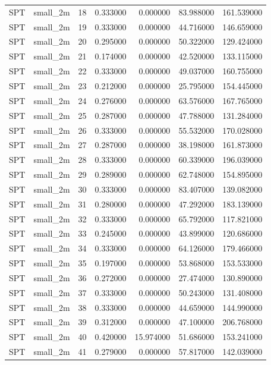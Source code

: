 \begin{tabular}{llrrrrr}
SPT & small_2m & 18 & 0.333000 & 0.000000 & 83.988000 & 161.539000 \\
SPT & small_2m & 19 & 0.333000 & 0.000000 & 44.716000 & 146.659000 \\
SPT & small_2m & 20 & 0.295000 & 0.000000 & 50.322000 & 129.424000 \\
SPT & small_2m & 21 & 0.174000 & 0.000000 & 42.520000 & 133.115000 \\
SPT & small_2m & 22 & 0.333000 & 0.000000 & 49.037000 & 160.755000 \\
SPT & small_2m & 23 & 0.212000 & 0.000000 & 25.795000 & 154.445000 \\
SPT & small_2m & 24 & 0.276000 & 0.000000 & 63.576000 & 167.765000 \\
SPT & small_2m & 25 & 0.287000 & 0.000000 & 47.788000 & 131.284000 \\
SPT & small_2m & 26 & 0.333000 & 0.000000 & 55.532000 & 170.028000 \\
SPT & small_2m & 27 & 0.287000 & 0.000000 & 38.198000 & 161.873000 \\
SPT & small_2m & 28 & 0.333000 & 0.000000 & 60.339000 & 196.039000 \\
SPT & small_2m & 29 & 0.289000 & 0.000000 & 62.748000 & 154.895000 \\
SPT & small_2m & 30 & 0.333000 & 0.000000 & 83.407000 & 139.082000 \\
SPT & small_2m & 31 & 0.280000 & 0.000000 & 47.292000 & 183.139000 \\
SPT & small_2m & 32 & 0.333000 & 0.000000 & 65.792000 & 117.821000 \\
SPT & small_2m & 33 & 0.245000 & 0.000000 & 43.899000 & 120.686000 \\
SPT & small_2m & 34 & 0.333000 & 0.000000 & 64.126000 & 179.466000 \\
SPT & small_2m & 35 & 0.197000 & 0.000000 & 53.868000 & 153.533000 \\
SPT & small_2m & 36 & 0.272000 & 0.000000 & 27.474000 & 130.890000 \\
SPT & small_2m & 37 & 0.333000 & 0.000000 & 50.243000 & 131.408000 \\
SPT & small_2m & 38 & 0.333000 & 0.000000 & 44.659000 & 144.990000 \\
SPT & small_2m & 39 & 0.312000 & 0.000000 & 47.100000 & 206.768000 \\
SPT & small_2m & 40 & 0.420000 & 15.974000 & 51.686000 & 153.241000 \\
SPT & small_2m & 41 & 0.279000 & 0.000000 & 57.817000 & 142.039000 \\

\end{tabular}
